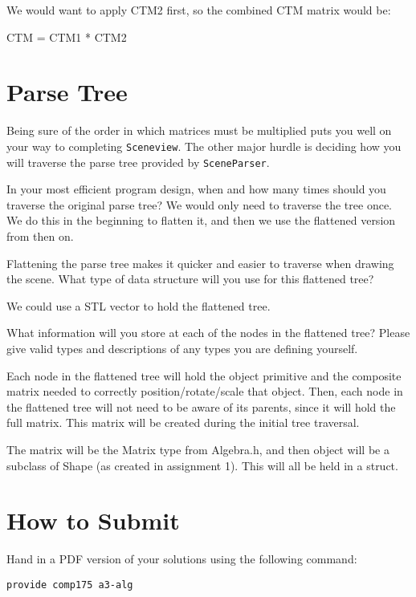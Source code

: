 \documentclass[10pt,twocolumn]{article}
\begin{document}
\begin{framed}

We would want to apply CTM2 first, so the combined CTM matrix would be:

CTM = CTM1 * CTM2

\end{framed}


\section{Parse Tree}
Being sure of the order in which matrices must be multiplied puts you well on your way to completing {\tt Sceneview}. The other major hurdle is deciding how you will traverse the parse tree provided by {\tt SceneParser}.
\begin{framed}
\noindent {\bf [1 point]} In your most efficient program design, when and how many times should you traverse the original parse tree?
We would only need to traverse the tree once. We do this in the beginning to flatten it, and then we use the flattened version from then on.
\end{framed}
\begin{framed}
\noindent {\bf [1 point]} Flattening the parse tree makes it quicker and easier to traverse when drawing the scene. What type of data structure will you use for this flattened tree?

We could use a STL vector to hold the flattened tree.

\end{framed}
\begin{framed}
\noindent {\bf [1 point]} What information will you store at each of the nodes in the flattened tree? Please give valid types and descriptions of any types you are defining yourself.

Each node in the flattened tree will hold the object primitive and the composite matrix needed to correctly position/rotate/scale that object. Then, each node in the flattened tree will not need to be aware of its parents, since it will hold the full matrix. This matrix will be created during the initial tree traversal.

The matrix will be the Matrix type from Algebra.h, and then object will be a subclass of Shape (as created in assignment 1). This will all be held in a struct.

\end{framed}

\section{How to Submit}

Hand in a PDF version of your solutions using the following command:
\begin{center}
 {\tt provide comp175 a3-alg}
 \end{center}
\end{document}
